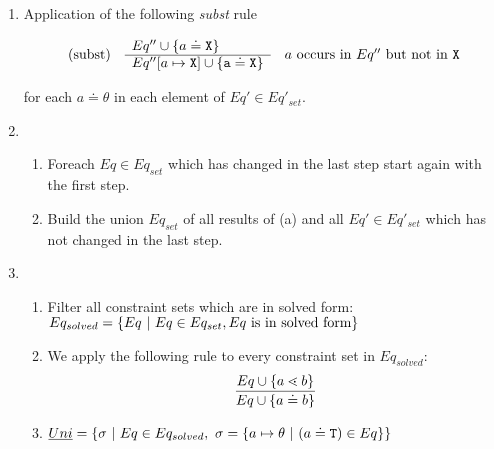 \begin{enumerate}
\item \label{subst-step}  Application of the following \emph{subst} rule
    
      $$\begin{array}[c]{lll}
        (\mathrm{subst}) &
        \begin{array}[c]{l}
          Eq'' \cup \{ a \doteq \tt{X} \}\\
          \hline
          Eq''[a \mapsto \tt{X}] \cup \{ a \doteq \tt{X} \}
        \end{array}
        & a \textrm{ occurs in } Eq'' \textrm{ but not in } \tt{X} 
      \end{array}$$
      
      for each $a \doteq \theta$ in each element of $Eq' \in Eq'_{set}$.

\item 
    \begin{enumerate}
    \item Foreach $Eq \in Eq_{set}$ which has changed in the last step
      start again with the first step.
    \item Build the union $Eq_{set}$ of all results of (a) and all $Eq' \in
      Eq'_{set}$ which has not changed in the last step.
    \end{enumerate}
\item
\begin{enumerate}
\item Filter all constraint sets which are in solved form:\\
$Eq_{solved} = \{  Eq \ | \ Eq \in Eq_{set}, Eq \ \text{is in solved form} \}$
\item We apply the following rule to every constraint set in $Eq_{solved}$:
\begin{align*}
\ddfrac{
  Eq \cup \set{ a \lessdot b } %
}{
  Eq \cup \set{ a \doteq b }
}
\end{align*}
\item $\emph{Uni} = \{ \sigma \ | \ Eq \in Eq_{solved},\ \sigma = \{ a \mapsto \theta \ | \ (a \doteq \texttt{T}) \in Eq \}  \}$
\end{enumerate}
\end{enumerate}


